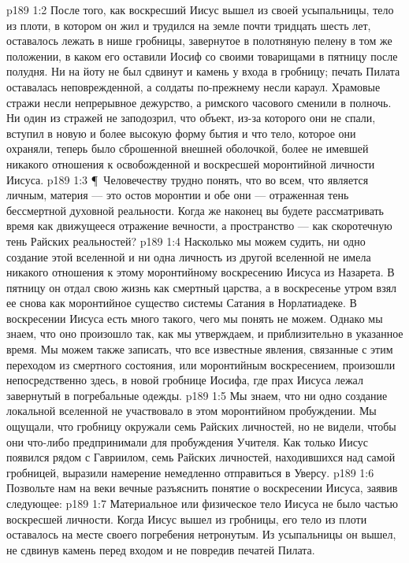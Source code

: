\vs p189 1:2 После того, как воскресший Иисус вышел из своей усыпальницы, тело из плоти, в котором он жил и трудился на земле почти тридцать шесть лет, оставалось лежать в нише гробницы, завернутое в полотняную пелену в том же положении, в каком его оставили Иосиф со своими товарищами в пятницу после полудня. Ни на йоту не был сдвинут и камень у входа в гробницу; печать Пилата оставалась неповрежденной, а солдаты по\hyp{}прежнему несли караул. Храмовые стражи несли непрерывное дежурство, а римского часового сменили в полночь. Ни один из стражей не заподозрил, что объект, из\hyp{}за которого они не спали, вступил в новую и более высокую форму бытия и что тело, которое они охраняли, теперь было сброшенной внешней оболочкой, более не имевшей никакого отношения к освобожденной и воскресшей моронтийной личности Иисуса.
\vs p189 1:3 \P\ Человечеству трудно понять, что во всем, что является личным, материя --- это остов моронтии и обе они --- отраженная тень бессмертной духовной реальности. Когда же наконец вы будете рассматривать время как движущееся отражение вечности, а пространство --- как скоротечную тень Райских реальностей?
\vs p189 1:4 Насколько мы можем судить, ни одно создание этой вселенной и ни одна личность из другой вселенной не имела никакого отношения к этому моронтийному воскресению Иисуса из Назарета. В пятницу он отдал свою жизнь как смертный царства, а в воскресенье утром взял ее снова как моронтийное существо системы Сатания в Норлатиадеке. В воскресении Иисуса есть много такого, чего мы понять не можем. Однако мы знаем, что оно произошло так, как мы утверждаем, и приблизительно в указанное время. Мы можем также записать, что все известные явления, связанные с этим переходом из смертного состояния, или моронтийным воскресением, произошли непосредственно здесь, в новой гробнице Иосифа, где прах Иисуса лежал завернутый в погребальные одежды.
\vs p189 1:5 Мы знаем, что ни одно создание локальной вселенной не участвовало в этом моронтийном пробуждении. Мы ощущали, что гробницу окружали семь Райских личностей, но не видели, чтобы они что\hyp{}либо предпринимали для пробуждения Учителя. Как только Иисус появился рядом с Гавриилом, семь Райских личностей, находившихся над самой гробницей, выразили намерение немедленно отправиться в Уверсу.
\vs p189 1:6 Позвольте нам на веки вечные разъяснить понятие о воскресении Иисуса, заявив следующее:
\vs p189 1:7 \bibnobreakspace Материальное или физическое тело Иисуса не было частью воскресшей личности. Когда Иисус вышел из гробницы, его тело из плоти оставалось на месте своего погребения нетронутым. Из усыпальницы он вышел, не сдвинув камень перед входом и не повредив печатей Пилата.
